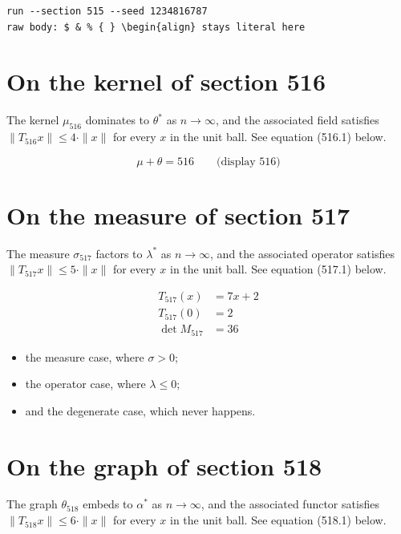 \documentclass{article}
\begin{document}
\begin{verbatim}
run --section 515 --seed 1234816787
raw body: $ & % { } \begin{align} stays literal here
\end{verbatim}

\section{On the kernel of section 516}
The kernel $\mu_{516}$ dominates to $\theta^{*}$ as $n \to \infty$,
and the associated field satisfies $\|T_{516} x\| \leq 4 \cdot \|x\|$
for every $x$ in the unit ball. See equation (516.1) below.

$$
\mu + \theta = 516 \qquad \text{(display 516)}
$$

\section{On the measure of section 517}
The measure $\sigma_{517}$ factors to $\lambda^{*}$ as $n \to \infty$,
and the associated operator satisfies $\|T_{517} x\| \leq 5 \cdot \|x\|$
for every $x$ in the unit ball. See equation (517.1) below.

\begin{align}
T_{517}(x) &= 7 x + 2 \\
T_{517}(0) &= 2 \\
\det M_{517} &= 36
\end{align}

\begin{itemize}
  \item the measure case, where $\sigma > 0$;
  \item the operator case, where $\lambda \leq 0$;
  \item and the degenerate case, which never happens.
\end{itemize}

\section{On the graph of section 518}
The graph $\theta_{518}$ embeds to $\alpha^{*}$ as $n \to \infty$,
and the associated functor satisfies $\|T_{518} x\| \leq 6 \cdot \|x\|$
for every $x$ in the unit ball. See equation (518.1) below.
\end{document}
